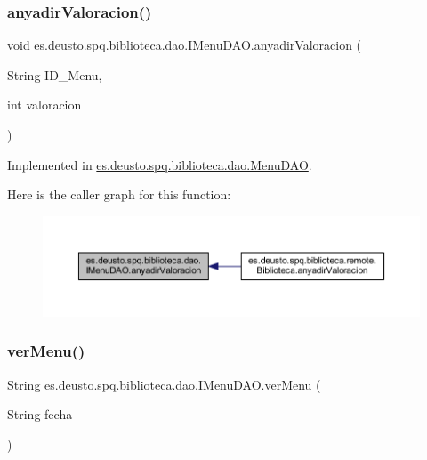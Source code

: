 \subsubsection{\texorpdfstring{anyadir\+Valoracion()}{anyadirValoracion()}}
{\footnotesize\ttfamily void es.\+deusto.\+spq.\+biblioteca.\+dao.\+I\+Menu\+D\+A\+O.\+anyadir\+Valoracion (\begin{DoxyParamCaption}\item[{String}]{I\+D\+\_\+\+Menu,  }\item[{int}]{valoracion }\end{DoxyParamCaption})}



Implemented in \mbox{\hyperlink{classes_1_1deusto_1_1spq_1_1biblioteca_1_1dao_1_1_menu_d_a_o_abdc102f8901cbab970e2791adf5865b9}{es.\+deusto.\+spq.\+biblioteca.\+dao.\+Menu\+D\+AO}}.

Here is the caller graph for this function\+:
\nopagebreak
\begin{figure}[H]
\begin{center}
\leavevmode
\includegraphics[width=350pt]{interfacees_1_1deusto_1_1spq_1_1biblioteca_1_1dao_1_1_i_menu_d_a_o_abd65ad2c5269cd19edc975518bf16b49_icgraph}
\end{center}
\end{figure}
\mbox{\label{interfacees_1_1deusto_1_1spq_1_1biblioteca_1_1dao_1_1_i_menu_d_a_o_ac92176efdcf5f320225152392db8cb8a}} 
\subsubsection{\texorpdfstring{ver\+Menu()}{verMenu()}}
{\footnotesize\ttfamily String es.\+deusto.\+spq.\+biblioteca.\+dao.\+I\+Menu\+D\+A\+O.\+ver\+Menu (\begin{DoxyParamCaption}\item[{String}]{fecha }\end{DoxyParamCaption})}



